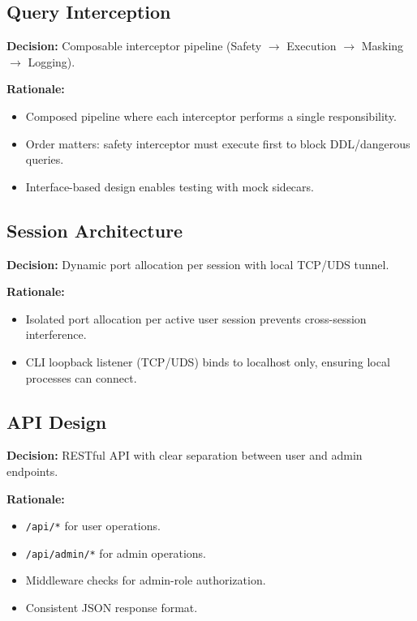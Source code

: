 \subsection{Query Interception}

\textbf{Decision:} Composable interceptor pipeline (Safety $\rightarrow$ Execution $\rightarrow$ Masking $\rightarrow$ Logging).

\textbf{Rationale:}
\begin{itemize}
    \item Composed pipeline where each interceptor performs a single responsibility.
    \item Order matters: safety interceptor must execute first to block DDL/dangerous queries.
    \item Interface-based design enables testing with mock sidecars.
\end{itemize}

\subsection{Session Architecture}

\textbf{Decision:} Dynamic port allocation per session with local TCP/UDS tunnel.

\textbf{Rationale:}
\begin{itemize}
    \item Isolated port allocation per active user session prevents cross-session interference.
    \item CLI loopback listener (TCP/UDS) binds to localhost only, ensuring local processes can connect.
\end{itemize}

\subsection{API Design}

\textbf{Decision:} RESTful API with clear separation between user and admin endpoints.

\textbf{Rationale:}
\begin{itemize}
    \item \texttt{/api/*} for user operations.
    \item \texttt{/api/admin/*} for admin operations.
    \item Middleware checks for admin-role authorization.
    \item Consistent JSON response format.
\end{itemize}

